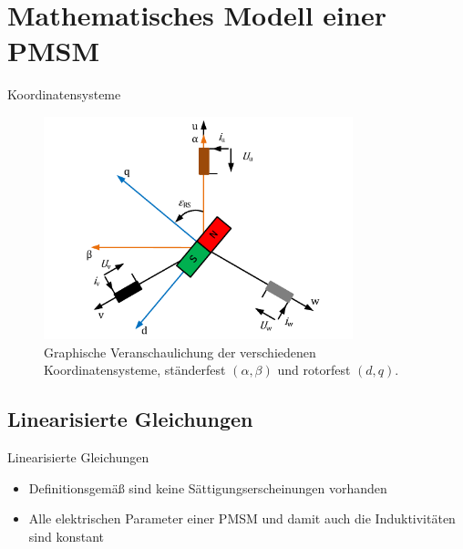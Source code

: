 \documentclass{beamer}
\newcommand{\x}[1]{\mathrm{#1}}
\begin{document}
\section{Mathematisches Modell einer PMSM}
\begin{frame}[plain]{Koordinatensysteme}
\begin{figure}[!t]
\centering
\includegraphics[width=0.8\textwidth]{img/synchron-grundlage}
\caption{Graphische Veranschaulichung der verschiedenen Koordinatensysteme, ständerfest $(\alpha, \beta)$ und rotorfest $(d, q)$.}
\label{fig:synchron-grundlage}
\end{figure}
\end{frame}

\subsection{Linearisierte Gleichungen}
\begin{frame}{Linearisierte Gleichungen}
\begin{itemize}
\pause \item Definitionsgemäß sind keine Sättigungserscheinungen vorhanden \autocites{mullerII2008}{schroder2001}
\pause \item Alle elektrischen Parameter einer PMSM und damit auch die Induktivitäten sind konstant
\end{itemize}


\end{frame}
\end{document}

